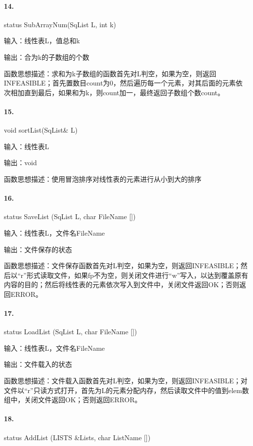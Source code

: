 \documentclass[supercite]{Experimental_Report}
\theoremstyle{definition}
\begin{document}
\paragraph{14.}status SubArrayNum(SqList L, int k)

输入：线性表L，值总和k

输出：合为k的子数组的个数

函数思想描述：求和为k子数组的函数首先对L判空，如果为空，则返回INFEASIBLE；首先置数目count为0，然后遍历每一个元素，对其后面的元素依次相加直到最后，如果和为k，则count加一，最终返回子数组个数count。

\paragraph{15.}void sortList(SqList\& L)

输入：线性表L

输出：void

函数思想描述：使用冒泡排序对线性表的元素进行从小到大的排序

\paragraph{16.}status SaveList (SqList L, char FileName [])

输入：线性表L，文件名FileName

输出：文件保存的状态

函数思想描述：文件保存函数首先对L判空，如果为空，则返回INFEASIBLE；然后以“r”形式读取文件，如果fp不为空，则关闭文件进行“w”写入，以达到覆盖原有内容的目的；然后将线性表的元素依次写入到文件中，关闭文件返回OK；否则返回ERROR。

\paragraph{17.}status LoadList (SqList L, char FileName [])

输入：线性表L，文件名FileName

输出：文件载入的状态

函数思想描述：文件载入函数首先对L判空，如果为空，则返回INFEASIBLE；对文件以“r”只读方式打开，首先为L的元素分配内存，然后读取文件中的值到elem数组中，关闭文件返回OK；否则返回ERROR。

\paragraph{18.}status AddList (LISTS \&Lists, char ListName [])
\end{document}
